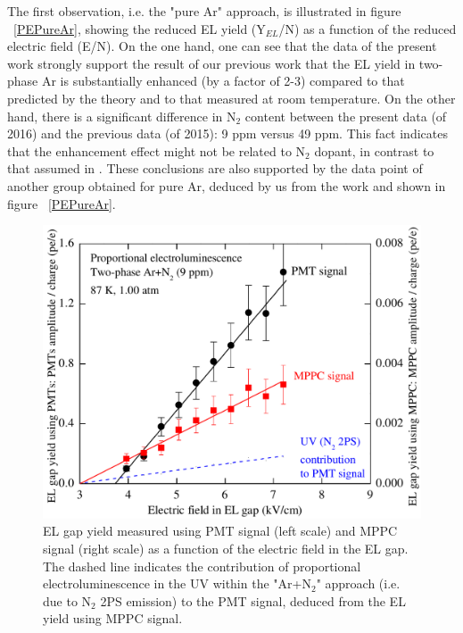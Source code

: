 \documentclass[a4paper,11pt]{article}
\begin{document}
The first observation, i.e. the "pure Ar" approach, is illustrated in figure ~\ref{PEPureAr}, showing the reduced EL yield (Y$_{EL}$/N) as a function of the reduced electric field (E/N). On the one hand, one can see that the data of the present work strongly support the result of our previous work that the EL yield in two-phase Ar is substantially enhanced (by a factor of 2-3) compared to that predicted by the theory and to that  measured at room temperature. On the other hand, there is a significant difference in N$_2$ content between the present data (of 2016) and the previous data (of 2015): 9 ppm versus 49 ppm. This fact indicates that the enhancement effect might not be related to N$_2$ dopant, in contrast to that assumed in \cite{CRADPropEL15}. These conclusions are also supported by the data point of another group obtained for pure Ar, deduced by us from the work \cite{Sangiorgio13} and shown in figure ~\ref{PEPureAr}.

\begin{figure}[hbt]
	\centering
	\includegraphics[width=0.6\columnwidth,keepaspectratio]{fig6}
	\caption{EL gap yield measured using PMT signal (left scale) and MPPC signal (right scale) as a function of the electric field in the EL gap. The dashed line indicates the contribution of proportional electroluminescence in the UV within the "Ar+N$_2$" approach (i.e. due to N$_2$ 2PS emission) to the PMT signal, deduced from the EL yield using MPPC signal.
	}
	\label{PEUV}
\end{figure}
\end{document}
